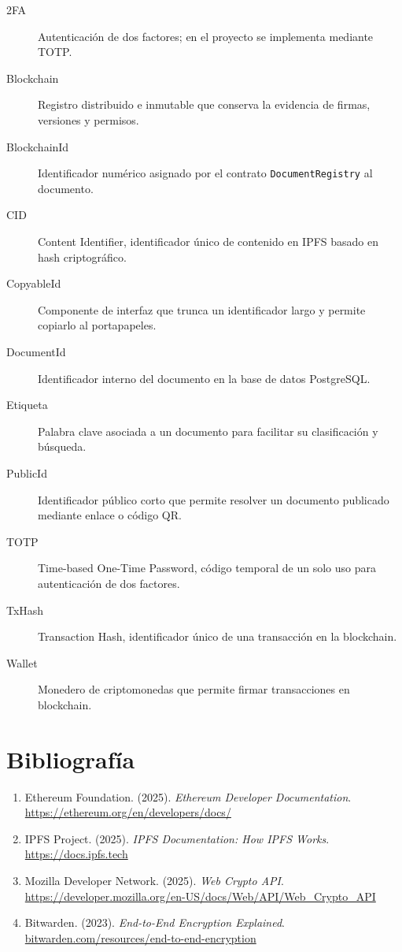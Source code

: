 \documentclass[11pt, a4paper]{article}
\begin{document}
\begin{description}
    \item[2FA] Autenticaci\'on de dos factores; en el proyecto se implementa mediante TOTP.
    \item[Blockchain] Registro distribuido e inmutable que conserva la evidencia de firmas, versiones y permisos.
    \item[BlockchainId] Identificador num\'erico asignado por el contrato \texttt{DocumentRegistry} al documento.
    \item[CID] Content Identifier, identificador \'unico de contenido en IPFS basado en hash criptogr\'afico.
    \item[CopyableId] Componente de interfaz que trunca un identificador largo y permite copiarlo al portapapeles.
    \item[DocumentId] Identificador interno del documento en la base de datos PostgreSQL.
    \item[Etiqueta] Palabra clave asociada a un documento para facilitar su clasificaci\'on y b\'usqueda.
    \item[PublicId] Identificador p\'ublico corto que permite resolver un documento publicado mediante enlace o c\'odigo QR.
    \item[TOTP] Time-based One-Time Password, c\'odigo temporal de un solo uso para autenticaci\'on de dos factores.
    \item[TxHash] Transaction Hash, identificador \'unico de una transacci\'on en la blockchain.
    \item[Wallet] Monedero de criptomonedas que permite firmar transacciones en blockchain.
\end{description}

\section*{Bibliografía}

\begin{enumerate}
    \item Ethereum Foundation. (2025). \textit{Ethereum Developer Documentation}. \url{https://ethereum.org/en/developers/docs/}

    \item IPFS Project. (2025). \textit{IPFS Documentation: How IPFS Works}. \url{https://docs.ipfs.tech}

    \item Mozilla Developer Network. (2025). \textit{Web Crypto API}. \url{https://developer.mozilla.org/en-US/docs/Web/API/Web_Crypto_API}

    \item Bitwarden. (2023). \textit{End-to-End Encryption Explained}. \href{https://bitwarden.com/resources/end-to-end-encryption/}{bitwarden.com/resources/end-to-end-encryption}
\end{enumerate}
\end{document}
